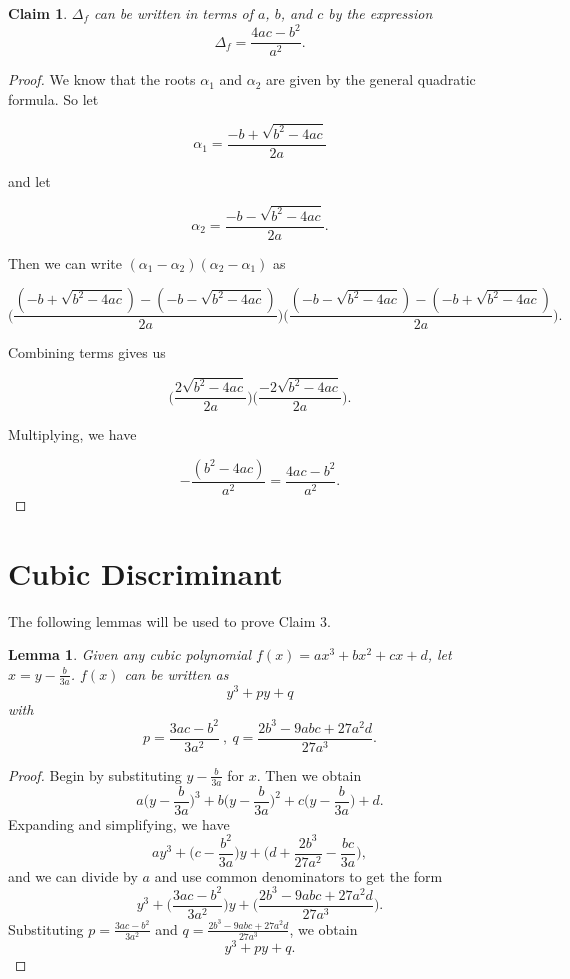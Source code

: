\documentclass[12pt]{amsart}
\newtheorem{lem}{Lemma}
\newtheorem{clm}{Claim}
\theoremstyle{case}
\begin{document}
	\begin{clm}
		$\Delta_f$ can be written in terms of $a$, $b$, and $c$ by the expression
		$$ \Delta_f = \frac{4ac - b^2}{a^2} . $$
	\end{clm}
	
	\begin{proof}
		We know that the roots $\alpha_1$ and $\alpha_2$ are given by the general quadratic formula. So let
		
		$$ \alpha_1 = \frac{-b + \sqrt{b^2 - 4ac}}{2a} $$
		
		and let
		
		$$ \alpha_2 = \frac{-b - \sqrt{b^2 - 4ac}}{2a} . $$
		
		Then we can write $(\alpha_1 - \alpha_2)(\alpha_2 - \alpha_1)$ as
		
		$$ \bigg( \frac{(-b + \sqrt{b^2 - 4ac})-(-b - \sqrt{b^2 - 4ac})}{2a} \bigg) \bigg( \frac{(-b - \sqrt{b^2 - 4ac})-(-b + \sqrt{b^2 - 4ac})}{2a} \bigg) . $$
		
		Combining terms gives us
		
		$$ \bigg( \frac{2\sqrt{b^2 - 4ac}}{2a} \bigg) \bigg( \frac{-2\sqrt{b^2 - 4ac}}{2a} \bigg) . $$
		
		Multiplying, we have
		
		$$ - \frac{(b^2 - 4ac)}{a^2} = \frac{4ac - b^2}{a^2} . $$
	\end{proof}

	\section{Cubic Discriminant}

	The following lemmas will be used to prove Claim 3.

	\begin{lem}
		\label{depressed}
		Given any cubic polynomial $f(x) = ax^3 + bx^2 + cx + d$, let $x = y - \frac{b}{3a}$. $f(x)$ can be written as
		$$ y^3 + py + q $$
		with
		$$ p = \frac{3ac-b^2}{3a^2} \ , \ q = \frac{2b^3 - 9abc + 27a^2d}{27a^3} . $$
	\end{lem}
	
	\begin{proof}
		Begin by substituting $y-\frac{b}{3a}$ for $x$. Then we obtain
		$$ a \Big( y-\frac{b}{3a} \Big)^3 + b\Big( y-\frac{b}{3a} \Big)^2 + c \Big( y-\frac{b}{3a} \Big) + d . $$
		Expanding and simplifying, we have
		$$ ay^3 + \Big( c - \frac{b^2}{3a} \Big) y + \Big(d + \frac{2b^3}{27a^2} - \frac{bc}{3a} \Big) , $$
		and we can divide by $a$ and use common denominators to get the form
		$$ y^3 + \Big( \frac{3ac-b^2}{3a^2} \Big) y + \Big( \frac{2b^3 - 9abc + 27a^2d}{27a^3} \Big) . $$
		Substituting $p = \frac{3ac-b^2}{3a^2}$ and $q = \frac{2b^3 - 9abc + 27a^2d}{27a^3}$, we obtain
		$$ y^3 + py + q . $$		
	\end{proof}
\end{document}
